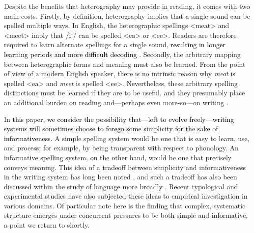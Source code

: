 \documentclass[doc,biblatex]{apa7}
\newcommand\newmaterial[1]{\textcolor{black}{#1}}
\begin{document}
Despite the benefits that heterography may provide in reading, it comes with two main costs. Firstly, by definition, heterography implies that a single sound can be spelled multiple ways. In English, the heterographic spellings <meat> and <meet> imply that /iː/ can be spelled <ea> or <ee>. Readers are therefore required to learn alternate spellings for a single sound, \newmaterial{resulting in longer learning periods and more difficult decoding \parencite{Reis:2020, Seymour:2003, Spencer:2003, Taylor:2011, Zhao:2018}}. Secondly, the arbitrary mapping between heterographic forms and meaning must also be learned. From the point of view of a modern English speaker, there is no intrinsic reason why \textit{meat} is spelled <ea> and \textit{meet} is spelled <ee>. Nevertheless, these arbitrary spelling distinctions must be learned if they are to be useful, and they presumably place an additional burden on reading and---perhaps even more-so---on writing \parencite{Frith:1979, Shankweiler:1992}.

\newmaterial{In this paper, we consider the possibility that---left to evolve freely---writing systems will sometimes choose to forego some simplicity for the sake of informativeness.} A simple spelling system would be one that is easy to learn, use, and process; for example, by being transparent with respect to phonology. An informative spelling system, on the other hand, would be one that precisely conveys meaning. This idea of a tradeoff between simplicity and informativeness in the writing system has long been noted \parencite[e.g.,][]{Coulmas:1991}, and such a tradeoff has also been discussed within the study of language more broadly \parencite[e.g.,][]{Gabelentz:1891, Zipf:1949, Martinet:1952, Rosch:1978}. Recent typological \parencite[e.g.,][]{Kemp:2018} and experimental \parencite[e.g.,][]{Kirby:2015} studies have also subjected these ideas to empirical investigation in various domains. Of particular note here is the finding that complex, systematic structure emerges under concurrent pressures to be both simple and informative, a point we return to shortly.
\end{document}
